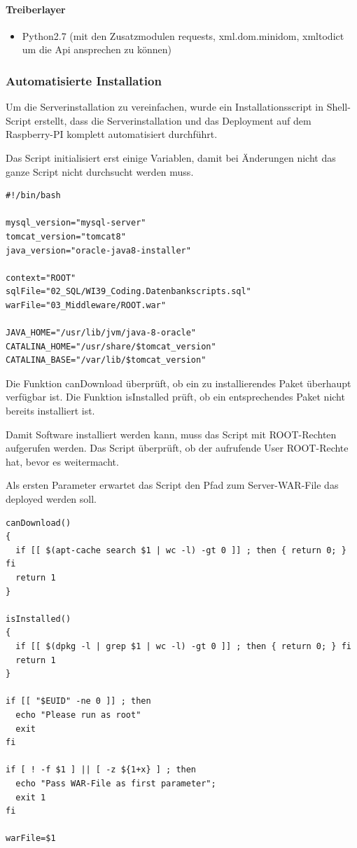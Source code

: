 \documentclass[]{article}
\providecommand{\tightlist}{%
  \setlength{\itemsep}{0pt}\setlength{\parskip}{0pt}}
\let\oldparagraph\paragraph
\renewcommand{\paragraph}[1]{\oldparagraph{#1}\mbox{}}
\begin{document}
\paragraph{Treiberlayer}\label{treiberlayer-1}

\begin{itemize}
\tightlist
\item
  Python2.7 (mit den Zusatzmodulen requests, xml.dom.minidom, xmltodict
  um die Api ansprechen zu können)
\end{itemize}

\subsubsection{Automatisierte
Installation}\label{automatisierte-installation}

Um die Serverinstallation zu vereinfachen, wurde ein Installationsscript
in Shell-Script erstellt, dass die Serverinstallation und das Deployment
auf dem Raspberry-PI komplett automatisiert durchführt.

Das Script initialisiert erst einige Variablen, damit bei Änderungen
nicht das ganze Script nicht durchsucht werden muss.

\begin{verbatim}
#!/bin/bash

mysql_version="mysql-server"
tomcat_version="tomcat8"
java_version="oracle-java8-installer"

context="ROOT"
sqlFile="02_SQL/WI39_Coding.Datenbankscripts.sql"
warFile="03_Middleware/ROOT.war"

JAVA_HOME="/usr/lib/jvm/java-8-oracle"
CATALINA_HOME="/usr/share/$tomcat_version"
CATALINA_BASE="/var/lib/$tomcat_version"
\end{verbatim}

Die Funktion canDownload überprüft, ob ein zu installierendes Paket
überhaupt verfügbar ist. Die Funktion isInstalled prüft, ob ein
entsprechendes Paket nicht bereits installiert ist.

Damit Software installiert werden kann, muss das Script mit ROOT-Rechten
aufgerufen werden. Das Script überprüft, ob der aufrufende User
ROOT-Rechte hat, bevor es weitermacht.

Als ersten Parameter erwartet das Script den Pfad zum Server-WAR-File
das deployed werden soll.

\begin{verbatim}
canDownload()
{
  if [[ $(apt-cache search $1 | wc -l) -gt 0 ]] ; then { return 0; } fi
  return 1
}

isInstalled()
{
  if [[ $(dpkg -l | grep $1 | wc -l) -gt 0 ]] ; then { return 0; } fi
  return 1
}

if [[ "$EUID" -ne 0 ]] ; then
  echo "Please run as root"
  exit
fi

if [ ! -f $1 ] || [ -z ${1+x} ] ; then
  echo "Pass WAR-File as first parameter"; 
  exit 1
fi

warFile=$1
\end{verbatim}
\end{document}
